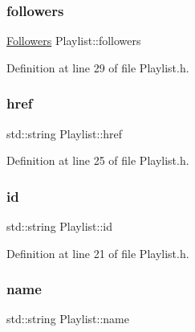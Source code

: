 \mbox{\label{class_playlist_aa720fd64c7d778938888002686c3b478}} 
\subsubsection{\texorpdfstring{followers}{followers}}
{\footnotesize\ttfamily \mbox{\hyperlink{class_followers}{Followers}} Playlist\+::followers\hspace{0.3cm}{\ttfamily [private]}}



Definition at line 29 of file Playlist.\+h.

\mbox{\label{class_playlist_aa4f4ab91921e32b7f95ae7d933b979e2}} 
\subsubsection{\texorpdfstring{href}{href}}
{\footnotesize\ttfamily std\+::string Playlist\+::href\hspace{0.3cm}{\ttfamily [private]}}



Definition at line 25 of file Playlist.\+h.

\mbox{\label{class_playlist_acbca3e2235543a11d0bca5a17789a97d}} 
\subsubsection{\texorpdfstring{id}{id}}
{\footnotesize\ttfamily std\+::string Playlist\+::id\hspace{0.3cm}{\ttfamily [private]}}



Definition at line 21 of file Playlist.\+h.

\mbox{\label{class_playlist_a6b06305db2f4b7bfadccd994665501cf}} 
\subsubsection{\texorpdfstring{name}{name}}
{\footnotesize\ttfamily std\+::string Playlist\+::name\hspace{0.3cm}{\ttfamily [private]}}



